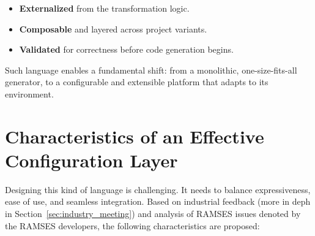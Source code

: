 \begin{itemize}
	\item \textbf{Externalized} from the transformation logic.
	\item \textbf{Composable} and layered across project variants.
	\item \textbf{Validated} for correctness before code generation begins.
\end{itemize}

Such language enables a fundamental shift: from a monolithic, one-size-fits-all generator, to a configurable and extensible platform that adapts to its environment.

\section{Characteristics of an Effective Configuration Layer}
\label{sec:config_language_characteristics}

Designing this kind of language is challenging. It needs to balance expressiveness, ease of use, and seamless integration. Based on industrial feedback (more in deph in Section~\ref{sec:industry_meeting}) and analysis of \gls{RAMSES} issues denoted by the \gls{RAMSES} developers, the following characteristics are proposed:

